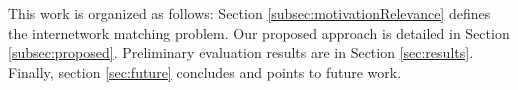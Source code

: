 \documentclass{llncs}
\begin{document}

This work is organized as follows: Section \ref{subsec:motivationRelevance} defines the internetwork matching problem. Our proposed approach is detailed in Section \ref{subsec:proposed}. Preliminary evaluation results are in Section \ref{sec:results}. Finally, section \ref{sec:future} concludes and points to future work.
 

\end{document}
